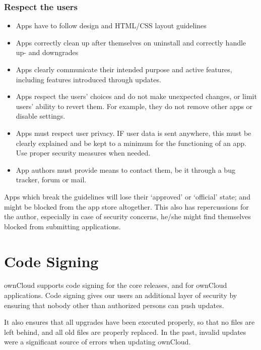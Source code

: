 \documentclass[letterpaper,10pt,english]{sphinxmanual}
\begin{document}
\subsubsection{Respect the users}
\label{app/publishing:respect-the-users}\begin{itemize}
\item {} 
Apps have to follow design and HTML/CSS layout guidelines

\item {} 
Apps correctly clean up after themselves on uninstall and correctly handle up- and downgrades

\item {} 
Apps clearly communicate their intended purpose and active features, including features introduced through updates.

\item {} 
Apps respect the users' choices and do not make unexpected changes, or limit users' ability to revert them. For example, they do not remove other apps or disable settings.

\item {} 
Apps must respect user privacy. IF user data is sent anywhere, this must be clearly explained and be kept to a minimum for the functioning of an app. Use proper security measures when needed.

\item {} 
App authors must provide means to contact them, be it through a bug tracker, forum or mail.

\end{itemize}

Apps which break the guidelines will lose their `approved' or `official' state; and might be blocked from the app store altogether. This also has repercussions for the author, especially in case of security concerns, he/she might find themselves blocked from submitting applications.


\section{Code Signing}
\label{app/code_signing:code-signing}\label{app/code_signing::doc}
ownCloud supports code signing for the core releases, and for ownCloud
applications. Code signing gives our users an additional layer of security by
ensuring that nobody other than authorized persons can push updates.

It also ensures that all upgrades have been executed properly, so that no files
are left behind, and all old files are properly replaced. In the past, invalid
updates were a significant source of errors when updating ownCloud.
\end{document}
